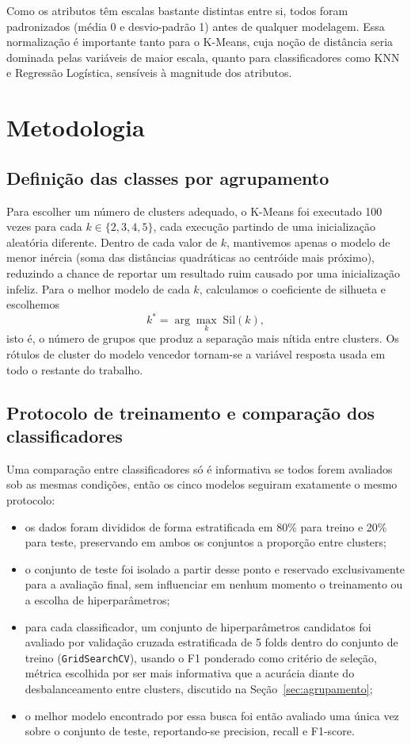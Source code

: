 \documentclass[a4paper,10pt]{article}
\begin{document}
Como os atributos têm escalas bastante distintas entre si, todos foram padronizados (média 0 e desvio-padrão 1) antes de qualquer modelagem. Essa normalização é importante tanto para o K-Means, cuja noção de distância seria dominada pelas variáveis de maior escala, quanto para classificadores como KNN e Regressão Logística, sensíveis à magnitude dos atributos.

\section{Metodologia}
\label{sec:metodologia}

\subsection{Definição das classes por agrupamento}

Para escolher um número de clusters adequado, o K-Means foi executado 100 vezes para cada $k \in \{2,3,4,5\}$, cada execução partindo de uma inicialização aleatória diferente. Dentro de cada valor de $k$, mantivemos apenas o modelo de menor inércia (soma das distâncias quadráticas ao centróide mais próximo), reduzindo a chance de reportar um resultado ruim causado por uma inicialização infeliz. Para o melhor modelo de cada $k$, calculamos o coeficiente de silhueta e escolhemos
$$k^{*} = \arg\max_{k} \; \text{Sil}(k),$$
isto é, o número de grupos que produz a separação mais nítida entre clusters. Os rótulos de cluster do modelo vencedor tornam-se a variável resposta usada em todo o restante do trabalho.

\subsection{Protocolo de treinamento e comparação dos classificadores}

Uma comparação entre classificadores só é informativa se todos forem avaliados sob as mesmas condições, então os cinco modelos seguiram exatamente o mesmo protocolo:

\begin{itemize}[nosep]
  \item os dados foram divididos de forma estratificada em 80\% para treino e 20\% para teste, preservando em ambos os conjuntos a proporção entre clusters;
  \item o conjunto de teste foi isolado a partir desse ponto e reservado exclusivamente para a avaliação final, sem influenciar em nenhum momento o treinamento ou a escolha de hiperparâmetros;
  \item para cada classificador, um conjunto de hiperparâmetros candidatos foi avaliado por validação cruzada estratificada de 5 folds dentro do conjunto de treino (\texttt{GridSearchCV}), usando o F1 ponderado como critério de seleção, métrica escolhida por ser mais informativa que a acurácia diante do desbalanceamento entre clusters, discutido na Seção~\ref{sec:agrupamento};
  \item o melhor modelo encontrado por essa busca foi então avaliado uma única vez sobre o conjunto de teste, reportando-se precision, recall e F1-score.
\end{itemize}
\end{document}

